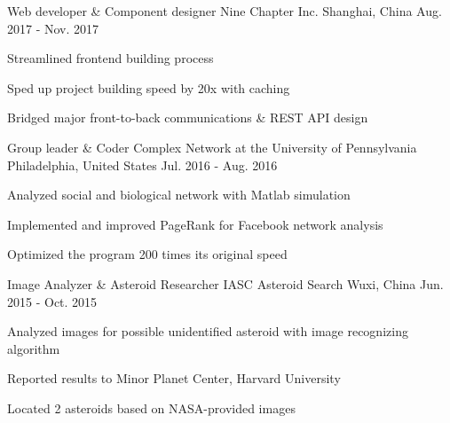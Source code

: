 \begin{cventries}
  \cventry
    {Web developer \& Component designer}
    {Nine Chapter Inc.}
    {Shanghai, China}
    {Aug. 2017 - Nov. 2017}
    {
      \begin{cvitems}
        \item {Streamlined frontend building process}
        \item {Sped up project building speed by 20x with caching}
        \item {Bridged major front-to-back communications \& REST API design}
      \end{cvitems}
    }

  \cventry
    {Group leader \& Coder}
    {Complex Network at the University of Pennsylvania}
    {Philadelphia, United States}
    {Jul. 2016 - Aug. 2016}
    {
      \begin{cvitems}
        \item {Analyzed social and biological network with Matlab simulation}
        \item {Implemented and improved PageRank for Facebook network analysis}
        \item {Optimized the program 200 times its original speed}
      \end{cvitems}
    }

  \cventry
    {Image Analyzer \& Asteroid Researcher}
    {IASC Asteroid Search}
    {Wuxi, China}
    {Jun. 2015 - Oct. 2015}
    {
      \begin{cvitems}
        \item {Analyzed images for possible unidentified asteroid with image recognizing algorithm}
        \item {Reported results to Minor Planet Center, Harvard University}
        \item {Located 2 asteroids based on NASA-provided images}
      \end{cvitems}
    }
\end{cventries}
